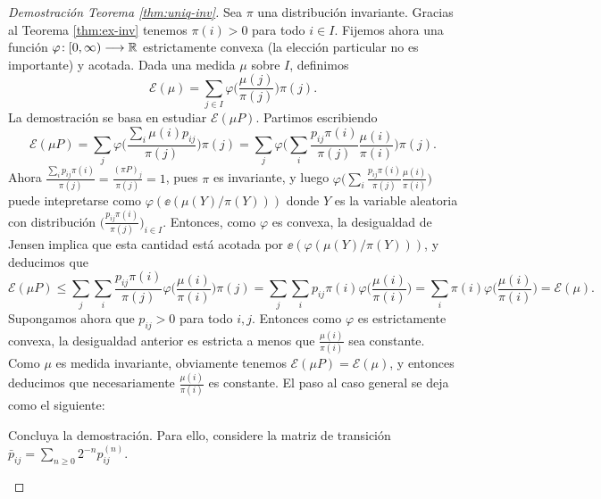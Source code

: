 \begin{proof}[Demostración Teorema \ref{thm:uniq-inv}]
Sea $\pi$ una distribución invariante.
Gracias al Teorema \ref{thm:ex-inv} tenemos $\pi(i)>0$ para todo $i\in I$.
Fijemos ahora una función $\varphi\!:[0,\infty)\longrightarrow\mathbb{R}$ estrictamente convexa (la elección particular no es importante) y acotada.
Dada una medida $\mu$ sobre $I$, definimos
\[\mathcal{E}(\mu)=\sum_{j\in I}\varphi\Big(\frac{\mu(j)}{\pi(j)}\Big)\pi(j).\]
La demostración se basa en estudiar $\mathcal{E}(\mu P)$.
Partimos escribiendo
\[\mathcal{E}(\mu P)=\sum_{j}\varphi\Big(\frac{\sum_i\mu(i)p_{ij}}{\pi(j)}\Big)\pi(j)
=\sum_{j}\varphi\Big(\sum_i\frac{p_{ij}\pi(i)}{\pi(j)}\frac{\mu(i)}{\pi(i)}\Big)\pi(j).\]
Ahora $\frac{\sum_ip_{ij}\pi(i)}{\pi(j)}=\frac{(\pi P)_j}{\pi(j)}=1$, pues $\pi$ es invariante, y luego $\varphi\Big(\sum_i\frac{p_{ij}\pi(i)}{\pi(j)}\frac{\mu(i)}{\pi(i)}\Big)$ puede intepretarse como $\varphi(\ee(\mu(Y)/\pi(Y)))$ donde $Y$ es la variable aleatoria con distribución $\big(\frac{p_{ij}\pi(i)}{\pi(j)}\big)_{i\in I}$.
Entonces, como $\varphi$ es convexa, la desigualdad de Jensen implica que esta cantidad está acotada por $\ee(\varphi(\mu(Y)/\pi(Y)))$, y deducimos que
\[\mathcal{E}(\mu P)\leq\sum_{j}\sum_i\frac{p_{ij}\pi(i)}{\pi(j)}\varphi\Big(\frac{\mu(i)}{\pi(i)}\Big)\pi(j)=\sum_{j}\sum_ip_{ij}\pi(i)\varphi\Big(\frac{\mu(i)}{\pi(i)}\Big)
=\sum_i\pi(i)\varphi\Big(\frac{\mu(i)}{\pi(i)}\Big)=\mathcal{E}(\mu).\]
Supongamos ahora que $p_{ij}>0$ para todo $i,j$.
Entonces como $\varphi$ es estrictamente convexa, la desigualdad anterior es estricta a menos que $\frac{\mu(i)}{\pi(i)}$ sea constante.
Como $\mu$ es medida invariante, obviamente tenemos $\mathcal{E}(\mu P)=\mathcal{E}(\mu)$, y entonces deducimos que necesariamente $\frac{\mu(i)}{\pi(i)}$ es constante.
El paso al caso general se deja como el siguiente:
\begin{exer}
Concluya la demostración.
Para ello, considere la matriz de transición $\bar p_{ij}=\sum_{n\geq0}2^{-n}p^{(n)}_{ij}$.\qedhere
\end{exer}
\end{proof}

